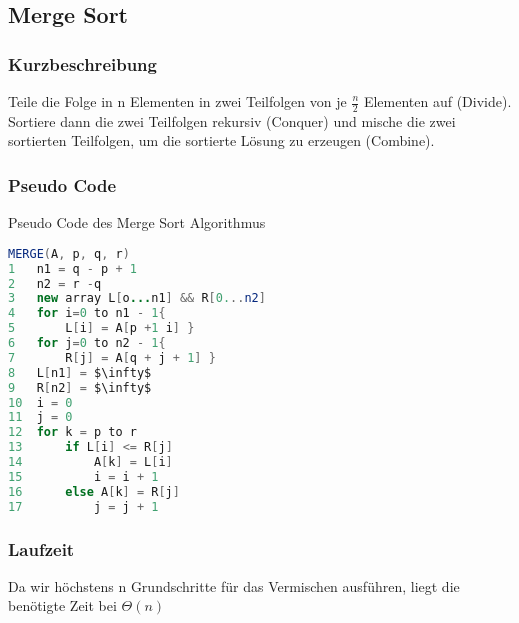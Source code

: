 \documentclass[jou,apacite]{apa6}
\begin{document}
\subsection{Merge Sort}
\subsubsection{Kurzbeschreibung} Teile die Folge in n Elementen in zwei Teilfolgen von je $\frac{n}{2}$  Elementen auf (Divide). Sortiere dann die zwei Teilfolgen rekursiv (Conquer) und mische die zwei sortierten Teilfolgen, um die sortierte Lösung zu erzeugen (Combine).

\subsubsection{Pseudo Code}
Pseudo Code des Merge Sort Algorithmus
\begin{lstlisting}[mathescape, language=java]
MERGE(A, p, q, r)
1   n1 = q - p + 1
2   n2 = r -q
3   new array L[o...n1] && R[0...n2]
4   for i=0 to n1 - 1{
5       L[i] = A[p +1 i] }
6   for j=0 to n2 - 1{
7       R[j] = A[q + j + 1] } 
8   L[n1] = $\infty$
9   R[n2] = $\infty$
10  i = 0
11  j = 0
12  for k = p to r
13      if L[i] <= R[j]
14          A[k] = L[i]
15          i = i + 1
16      else A[k] = R[j]
17          j = j + 1
\end{lstlisting}

\subsubsection{Laufzeit}
Da wir höchstens n Grundschritte für das Vermischen ausführen, liegt die benötigte Zeit bei $\Theta (n)$
\end{document}
